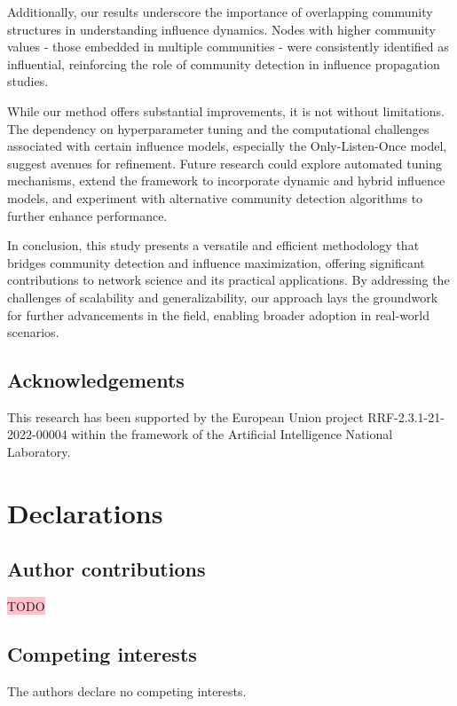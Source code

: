 \documentclass[pdflatex,sn-mathphys-ay]{sn-jnl}
\begin{document}
Additionally, our results underscore the importance of overlapping community structures in understanding influence dynamics. Nodes with higher community values - those embedded in multiple communities - were consistently identified as influential, reinforcing the role of community detection in influence propagation studies.

While our method offers substantial improvements, it is not without limitations. The dependency on hyperparameter tuning and the computational challenges associated with certain influence models, especially the Only-Listen-Once model, suggest avenues for refinement. Future research could explore automated tuning mechanisms, extend the framework to incorporate dynamic and hybrid influence models, and experiment with alternative community detection algorithms to further enhance performance.

In conclusion, this study presents a versatile and efficient methodology that bridges community detection and influence maximization, offering significant contributions to network science and its practical applications. By addressing the challenges of scalability and generalizability, our approach lays the groundwork for further advancements in the field, enabling broader adoption in real-world scenarios.


\subsection*{Acknowledgements}\label{subsec_acknowledgements}

This research has been supported by the European Union project RRF-2.3.1-21-2022-00004 within the framework of the Artificial Intelligence National Laboratory.


\section*{Declarations}\label{sec_declarations}


\subsection*{Author contributions}\label{subsec_contributions}

\colorbox{pink}{TODO}


\subsection*{Competing interests}\label{subsec_competing}

The authors declare no competing interests.



\end{document}
